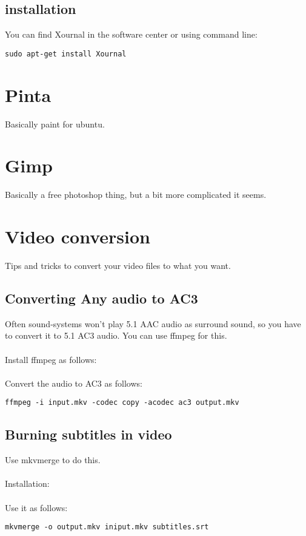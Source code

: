 \documentclass[a4paper]{article}
\begin{document}
\subsection{installation}
You can find Xournal in the software center or using command line:
\begin{lstlisting}
sudo apt-get install Xournal
\end{lstlisting}

\section{Pinta}
Basically paint for ubuntu.

\section{Gimp}
Basically a free photoshop thing, but a bit more complicated it seems.

\section{Video conversion}
Tips and tricks to convert your video files to what you want.

\subsection{Converting Any audio to AC3}
Often sound-systems won't play 5.1 AAC audio as surround sound, so you have to convert it to 5.1 AC3 audio. You can use ffmpeg for this.
\\
\\
Install ffmpeg as follows:
\\
\\
Convert the audio to AC3 as follows:
\begin{lstlisting}
ffmpeg -i input.mkv -codec copy -acodec ac3 output.mkv
\end{lstlisting}

\subsection{Burning subtitles in video}
Use mkvmerge to do this.
\\
\\
Installation:
\\
\\
Use it as follows:
\begin{lstlisting}
mkvmerge -o output.mkv iniput.mkv subtitles.srt 
\end{lstlisting}
\end{document}
